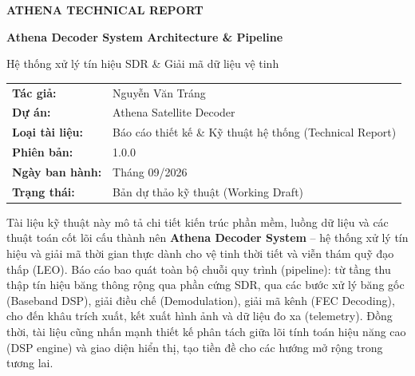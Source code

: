 \documentclass[11pt,a4paper]{article}
\begin{document}
\begin{titlepage}
    \centering
    \vspace*{1.0cm}

    {\Huge\bfseries\color{primaryblue} ATHENA TECHNICAL REPORT\par}
    \vspace{0.4cm}
    {\LARGE\bfseries\color{secondaryblue} Athena Decoder System Architecture \& Pipeline\par}
    \vspace{0.6cm}
    {\large Hệ thống xử lý tín hiệu SDR \& Giải mã dữ liệu vệ tinh\par}

    \vspace{1.5cm}

    \begin{tcolorbox}[colback=white, colframe=bordergray, arc=1.5mm, width=0.9\textwidth]
        \centering
        \begin{tabularx}{\textwidth}{lX}
            \textbf{Tác giả:}       & Nguyễn Văn Tráng                                         \\
            \textbf{Dự án:}         & Athena Satellite Decoder                                 \\
            \textbf{Loại tài liệu:} & Báo cáo thiết kế \& Kỹ thuật hệ thống (Technical Report) \\
            \textbf{Phiên bản:}     & 1.0.0                                                    \\
            \textbf{Ngày ban hành:} & Tháng 09/2026                                            \\
            \textbf{Trạng thái:}    & Bản dự thảo kỹ thuật (Working Draft)                     \\
        \end{tabularx}
    \end{tcolorbox}

    \vfill

    \begin{infobox}
        Tài liệu kỹ thuật này mô tả chi tiết kiến trúc phần mềm, luồng dữ liệu và các thuật toán cốt lõi cấu thành nên \textbf{Athena Decoder System} -- hệ thống xử lý tín hiệu và giải mã thời gian thực dành cho vệ tinh thời tiết và viễn thám quỹ đạo thấp (LEO). Báo cáo bao quát toàn bộ chuỗi quy trình (pipeline): từ tầng thu thập tín hiệu băng thông rộng qua phần cứng SDR, qua các bước xử lý băng gốc (Baseband DSP), giải điều chế (Demodulation), giải mã kênh (FEC Decoding), cho đến khâu trích xuất, kết xuất hình ảnh và dữ liệu đo xa (telemetry). Đồng thời, tài liệu cũng nhấn mạnh thiết kế phân tách giữa lõi tính toán hiệu năng cao (DSP engine) và giao diện hiển thị, tạo tiền đề cho các hướng mở rộng trong tương lai.
    \end{infobox}

    \vspace{0.8cm}
\end{titlepage}
\end{document}
